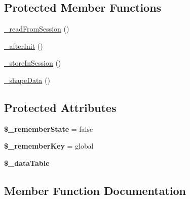 \subsection*{Protected Member Functions}
\begin{DoxyCompactItemize}
\item 
\hyperlink{classhamburgscleanest_1_1_data_tables_1_1_models_1_1_data_component_ae682ac7f1f1f9516c3cc2485ae5bcf4b}{\+\_\+read\+From\+Session} ()
\item 
\hyperlink{classhamburgscleanest_1_1_data_tables_1_1_models_1_1_data_component_a8b97dff3fa609aaed04b448e535ba0cc}{\+\_\+after\+Init} ()
\item 
\hyperlink{classhamburgscleanest_1_1_data_tables_1_1_models_1_1_data_component_a28881ca4bf07d4008e3ed3128198da59}{\+\_\+store\+In\+Session} ()
\item 
\hyperlink{classhamburgscleanest_1_1_data_tables_1_1_models_1_1_data_component_a6d4fda1024fd883f0750e5f0c531160d}{\+\_\+shape\+Data} ()
\end{DoxyCompactItemize}
\subsection*{Protected Attributes}
\begin{DoxyCompactItemize}
\item 
\mbox{\label{classhamburgscleanest_1_1_data_tables_1_1_models_1_1_data_component_a57effc70e4d12c60eb1f210d9870a43b}} 
{\bfseries \$\+\_\+remember\+State} = false
\item 
\mbox{\label{classhamburgscleanest_1_1_data_tables_1_1_models_1_1_data_component_af1957828bb9ad0679ab529f6dbf639af}} 
{\bfseries \$\+\_\+remember\+Key} = \textquotesingle{}global\textquotesingle{}
\item 
\mbox{\label{classhamburgscleanest_1_1_data_tables_1_1_models_1_1_data_component_a89674a8be52428c061003e413ce90575}} 
{\bfseries \$\+\_\+data\+Table}
\end{DoxyCompactItemize}


\subsection{Member Function Documentation}
\mbox{\label{classhamburgscleanest_1_1_data_tables_1_1_models_1_1_data_component_a8b97dff3fa609aaed04b448e535ba0cc}} 
